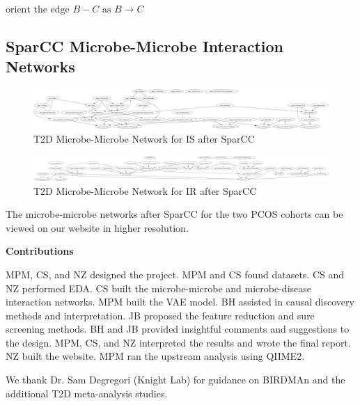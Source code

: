 \documentclass[12pt,letterpaper]{article}
\begin{document}
\begin{algorithm}[H]
\DontPrintSemicolon
\LinesNumbered
\setcounter{AlgoLine}{30}
 {
     {
        $\text{orient the edge $B - C$ as $B \to C$}$\;
    }
}
\end{algorithm}

\subsection{SparCC Microbe-Microbe Interaction Networks}

\begin{figure}[h!]
  \centering
  \includegraphics[width=\linewidth]{../graphs/t2d/sparcc_IS_norm.png}
  \caption{T2D Microbe-Microbe Network for IS after SparCC}
  \label{fig:t2dsparccISnorm}
\end{figure}

\begin{figure}[h!]
  \centering
  \includegraphics[width=\linewidth]{../graphs/t2d/sparcc_IR_norm.png}
  \caption{T2D Microbe-Microbe Network for IR after SparCC}
  \label{fig:t2dsparccIRnorm}
\end{figure}

The microbe-microbe networks after SparCC for the two PCOS cohorts can be viewed on our website in higher resolution.

\clearpage
\textbf{Contributions}

MPM, CS, and NZ designed the project. MPM and CS found datasets. CS and NZ performed EDA. CS built the microbe-microbe and microbe-disease interaction networks. MPM built the VAE model. BH assisted in causal discovery methods and interpretation. JB proposed the feature reduction and sure screening methods. BH and JB provided insightful comments and suggestions to the design. MPM, CS, and NZ interpreted the results and wrote the final report. NZ built the website. MPM ran the upstream analysis using QIIME2. 

We thank Dr. Sam Degregori (Knight Lab) for guidance on BIRDMAn and the additional T2D meta-analysis studies. 
\end{document}
